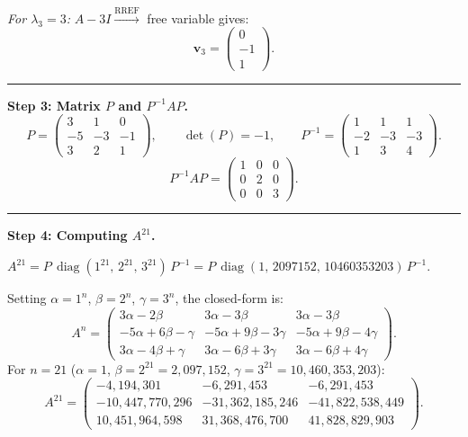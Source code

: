 \documentclass[12pt,a3paper]{article}
\begin{document}
\begin{tcolorbox}
\textit{For $\lambda_3 = 3$:} \;$A - 3I \xrightarrow{\text{RREF}}$ free variable gives:
\[
  \mathbf{v}_3 = \begin{pmatrix}0\\-1\\1\end{pmatrix}.
\]
 
\medskip\textcolor{cE}{\rule{\textwidth}{0.4pt}}
 
\textbf{Step 3: Matrix $P$ and $P^{-1}AP$.}
\[
  P = \begin{pmatrix}3&1&0\\-5&-3&-1\\3&2&1\end{pmatrix}, \qquad
  \det(P) = -1, \qquad
  P^{-1} = \begin{pmatrix}1&1&1\\-2&-3&-3\\1&3&4\end{pmatrix}.
\]
\[
  \boxed{P^{-1}AP = \begin{pmatrix}1&0&0\\0&2&0\\0&0&3\end{pmatrix}.}
\]
 
\medskip\textcolor{cE}{\rule{\textwidth}{0.4pt}}
 
\textbf{Step 4: Computing $A^{21}$.}
 
$A^{21} = P\,\operatorname{diag}(1^{21},\,2^{21},\,3^{21})\,P^{-1}
         = P\,\operatorname{diag}(1,\,2097152,\,10460353203)\,P^{-1}$.
 
Setting $\alpha = 1^n$, $\beta = 2^n$, $\gamma = 3^n$, the closed-form is:
\[
  A^n = \begin{pmatrix}
    3\alpha - 2\beta       & 3\alpha - 3\beta       & 3\alpha - 3\beta \\
   -5\alpha+6\beta-\gamma  & -5\alpha+9\beta-3\gamma & -5\alpha+9\beta-4\gamma \\
    3\alpha-4\beta+\gamma  &  3\alpha-6\beta+3\gamma &  3\alpha-6\beta+4\gamma
  \end{pmatrix}.
\]
For $n = 21$ ($\alpha=1$, $\beta=2^{21}=2{,}097{,}152$, $\gamma=3^{21}=10{,}460{,}353{,}203$):
\[
  \boxed{A^{21} = \begin{pmatrix}
    -4{,}194{,}301 & -6{,}291{,}453 & -6{,}291{,}453 \\
    -10{,}447{,}770{,}296 & -31{,}362{,}185{,}246 & -41{,}822{,}538{,}449 \\
    10{,}451{,}964{,}598  &  31{,}368{,}476{,}700  &  41{,}828{,}829{,}903
  \end{pmatrix}.}
\]
 
\end{tcolorbox}
 
\end{document}
